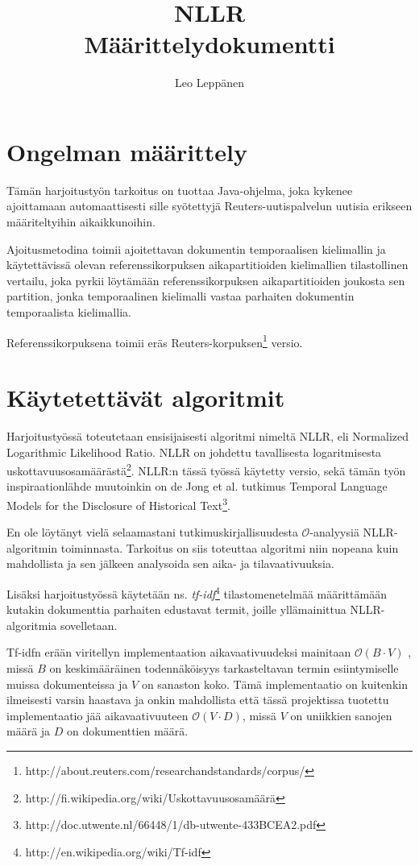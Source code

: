 \documentclass[12pt,a4paper]{article}
\author{Leo Leppänen}
\title{NLLR \\ Määrittelydokumentti}
\begin{document}
\maketitle

\section{Ongelman määrittely}
Tämän harjoitustyön tarkoitus on tuottaa Java-ohjelma, joka kykenee ajoittamaan automaattisesti sille syötettyjä Reuters-uutispalvelun uutisia erikseen määriteltyihin aikaikkunoihin.

Ajoitusmetodina toimii ajoitettavan dokumentin temporaalisen kielimallin ja käytettävissä olevan referenssikorpuksen aikapartitioiden kielimallien tilastollinen vertailu, joka pyrkii löytämään referenssikorpuksen aikapartitioiden joukosta sen partition, jonka temporaalinen kielimalli vastaa parhaiten dokumentin temporaalista kielimallia.

Referenssikorpuksena toimii eräs Reuters-korpuksen\footnote{http://about.reuters.com/researchandstandards/corpus/} versio.

\section{Käytetettävät algoritmit}
Harjoitustyössä toteutetaan ensisijaisesti algoritmi nimeltä NLLR, eli Normalized Logarithmic Likelihood Ratio. 
NLLR on johdettu tavallisesta logaritmisesta uskottavuusosamäärästä\footnote{http://fi.wikipedia.org/wiki/Uskottavuusosamäärä}. NLLR:n tässä työssä käytetty versio, sekä tämän työn inspiraationlähde muutoinkin on de Jong et al. tutkimus Temporal Language Models for the
Disclosure of Historical Text\footnote{http://doc.utwente.nl/66448/1/db-utwente-433BCEA2.pdf}.

En ole löytänyt vielä selaamastani tutkimuskirjallisuudesta $ \mathcal{O} $-analyysiä NLLR-algoritmin toiminnasta. 
Tarkoitus on siis toteuttaa algoritmi niin nopeana kuin mahdollista ja sen jälkeen analysoida sen aika- ja tilavaativuuksia.

Lisäksi harjoitustyössä käytetään ns. \emph{tf-idf}\footnote{http://en.wikipedia.org/wiki/Tf-idf} tilastomenetelmää määrittämään kutakin dokumenttia parhaiten edustavat termit, joille yllämainittua NLLR-algoritmia sovelletaan.

Tf-idfn erään viritellyn implementaation aikavaativuudeksi mainitaan $\mathcal{O}(B \cdot V)$ , missä $B$ on keskimääräinen todennäköisyys tarkasteltavan termin esiintymiselle muissa dokumenteissa ja $V$ on sanaston koko. Tämä implementaatio on kuitenkin ilmeisesti varsin haastava ja onkin mahdollista että tässä projektissa tuotettu implementaatio jää aikavaativuuteen $\mathcal{O}(V \cdot D)$, missä $V$ on uniikkien sanojen määrä ja $D$ on dokumenttien määrä.
\end{document}
